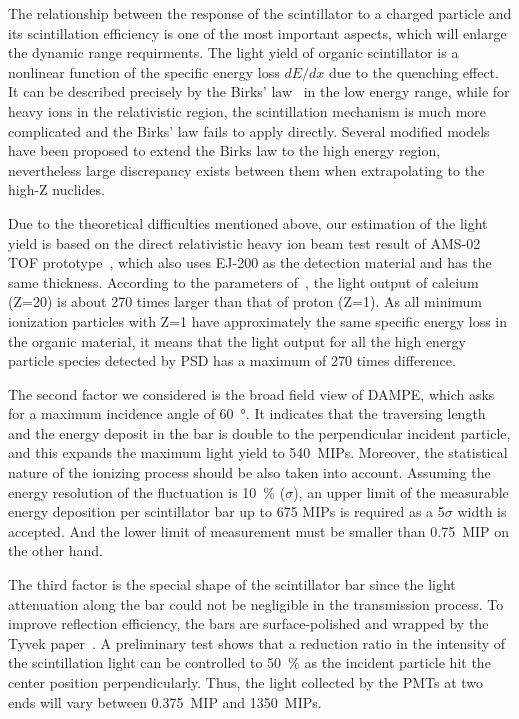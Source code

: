 \documentclass[preprint, times]{elsarticle}
\begin{document}
The relationship between the response of the scintillator to a charged particle and its scintillation efficiency is one of the most important aspects, which will enlarge the dynamic range requirments. The light yield of organic scintillator is a nonlinear function of the specific energy loss $dE/dx$ due to the quenching effect.
It can be described precisely by the Birks' law~\cite{birks_theory_2013} in the low energy range, while for heavy ions in the relativistic region, the scintillation mechanism is much more complicated and the Birks' law fails to apply directly. Several modified models~\cite{chou_nature_1952,tarle_cosmic_1979,menchaca-rocha_response_1999,matsufuji_response_1999} have been proposed to extend the Birks law to the high energy region, nevertheless large discrepancy exists between them when extrapolating to the high-Z nuclides.

Due to the theoretical difficulties mentioned above, our estimation of the light yield is based on the direct relativistic heavy ion beam test result of AMS-02 TOF prototype~\cite{bindi2005performance,bindi_calibration_2014}, which also uses EJ-200 as the detection material and has the same thickness.
According to the parameters of~\cite{bindi2005performance}, the light output of calcium (Z=20) is about 270 times larger than that of proton (Z=1).
As all minimum ionization particles with Z=1 have approximately the same specific energy loss in the organic material, it means that the light output for all the high energy particle species detected by PSD has a maximum of 270 times difference.

The second factor we considered is the broad field view of DAMPE, which asks for a maximum incidence angle of \SI{60}{\degree}. It indicates that the traversing length and the energy deposit in the bar is double to the perpendicular incident particle, and this expands the maximum light yield to \SI{540}{MIPs}. Moreover, the statistical nature of the ionizing process should be also taken into account. Assuming the energy resolution of the fluctuation is \SI{10}{\percent} ($\sigma$), an upper limit of the measurable energy deposition per scintillator bar up to 675 MIPs is required as a 5$\sigma$ width is accepted. And the lower limit of measurement must be smaller than \SI{0.75}{MIP} on the other hand.

The third factor is the special shape of the scintillator bar since the light attenuation along the bar could not be negligible in the transmission process.
To improve reflection efficiency, the bars are surface-polished and wrapped by the Tyvek paper~\cite{tyvek}. A preliminary test shows that a reduction ratio in the intensity of the scintillation light can be controlled to \SI{50}{\percent} as the incident particle hit the center position perpendicularly. Thus, the light collected by the PMTs at two ends will vary between \SI{0.375}{MIP} and \SI{1350}{MIPs}.
\end{document}
